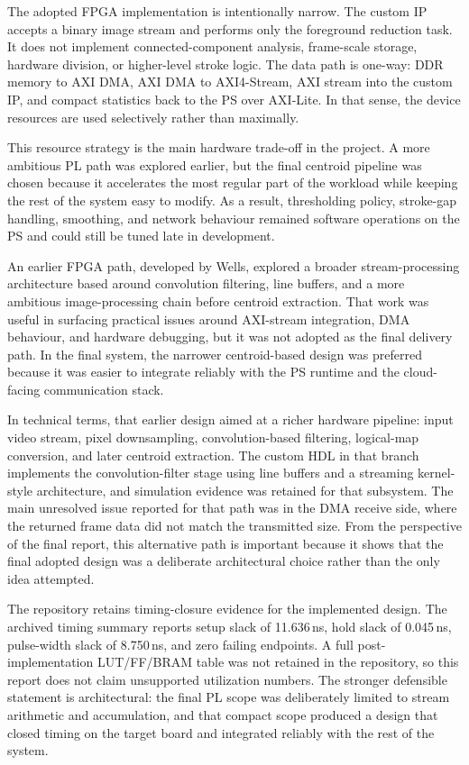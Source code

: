 \documentclass[10pt,a4paper]{article}
\begin{document}
The adopted FPGA implementation is intentionally narrow. The custom IP accepts a
binary image stream and performs only the foreground reduction task. It does not
implement connected-component analysis, frame-scale storage, hardware division,
or higher-level stroke logic. The data path is one-way: DDR memory to AXI DMA,
AXI DMA to AXI4-Stream, AXI stream into the custom IP, and compact statistics
back to the PS over AXI-Lite. In that sense, the device resources are used
selectively rather than maximally.

This resource strategy is the main hardware trade-off in the project. A more
ambitious PL path was explored earlier, but the final centroid pipeline was
chosen because it accelerates the most regular part of the workload while
keeping the rest of the system easy to modify. As a result, thresholding
policy, stroke-gap handling, smoothing, and network behaviour remained software
operations on the PS and could still be tuned late in development.

An earlier FPGA path, developed by Wells, explored a broader stream-processing
architecture based around convolution filtering, line buffers, and a more
ambitious image-processing chain before centroid extraction. That work was
useful in surfacing practical issues around AXI-stream integration, DMA
behaviour, and hardware debugging, but it was not adopted as the final delivery
path. In the final system, the narrower centroid-based design was preferred
because it was easier to integrate reliably with the PS runtime and the
cloud-facing communication stack.

In technical terms, that earlier design aimed at a richer hardware pipeline:
input video stream, pixel downsampling, convolution-based filtering, logical-map
conversion, and later centroid extraction. The custom HDL in that branch
implements the convolution-filter stage using line buffers and a streaming
kernel-style architecture, and simulation evidence was retained for that
subsystem. The main unresolved issue reported for that path was in the DMA
receive side, where the returned frame data did not match the transmitted size.
From the perspective of the final report, this alternative path is important
because it shows that the final adopted design was a deliberate architectural
choice rather than the only idea attempted.

The repository retains timing-closure evidence for the implemented design. The
archived timing summary reports setup slack of 11.636\,ns, hold slack of
0.045\,ns, pulse-width slack of 8.750\,ns, and zero failing endpoints. A full
post-implementation LUT/FF/BRAM table was not retained in the repository, so
this report does not claim unsupported utilization numbers. The stronger
defensible statement is architectural: the final PL scope was deliberately
limited to stream arithmetic and accumulation, and that compact scope produced a
design that closed timing on the target board and integrated reliably with the
rest of the system.
\end{document}
